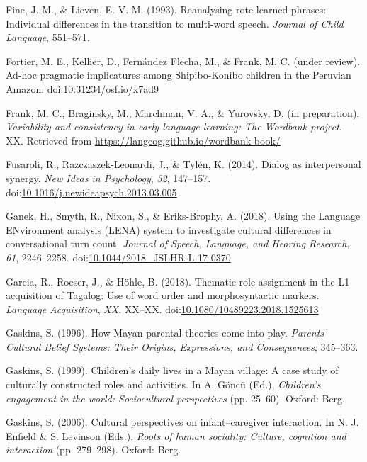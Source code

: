 \documentclass[floatsintext,man]{apa6}
\theoremstyle{definition}
\theoremstyle{definition}
\theoremstyle{definition}
\theoremstyle{remark}
\begin{document}
\hypertarget{ref-pine1993reanalysing}{}
Fine, J. M., \& Lieven, E. V. M. (1993). Reanalysing rote-learned
phrases: Individual differences in the transition to multi-word speech.
\emph{Journal of Child Language}, 551--571.

\hypertarget{ref-fortierURadhoc}{}
Fortier, M. E., Kellier, D., Fernández Flecha, M., \& Frank, M. C.
(under review). Ad-hoc pragmatic implicatures among Shipibo-Konibo
children in the Peruvian Amazon.
doi:\href{https://doi.org/10.31234/osf.io/x7ad9}{10.31234/osf.io/x7ad9}

\hypertarget{ref-frankIPvariability}{}
Frank, M. C., Braginsky, M., Marchman, V. A., \& Yurovsky, D. (in
preparation). \emph{Variability and consistency in early language
learning: The Wordbank project}. XX. Retrieved from
\url{https://langcog.github.io/wordbank-book/}

\hypertarget{ref-fusaroli2014synergy}{}
Fusaroli, R., Razczaszek-Leonardi, J., \& Tylén, K. (2014). Dialog as
interpersonal synergy. \emph{New Ideas in Psychology}, \emph{32},
147--157.
doi:\href{https://doi.org/10.1016/j.newideapsych.2013.03.005}{10.1016/j.newideapsych.2013.03.005}

\hypertarget{ref-ganek2018using}{}
Ganek, H., Smyth, R., Nixon, S., \& Eriks-Brophy, A. (2018). Using the
Language ENvironment analysis (LENA) system to investigate cultural
differences in conversational turn count. \emph{Journal of Speech,
Language, and Hearing Research}, \emph{61}, 2246--2258.
doi:\href{https://doi.org/10.1044/2018_JSLHR-L-17-0370}{10.1044/2018\_JSLHR-L-17-0370}

\hypertarget{ref-garcia2018thematic}{}
Garcia, R., Roeser, J., \& Höhle, B. (2018). Thematic role assignment in
the L1 acquisition of Tagalog: Use of word order and morphosyntactic
markers. \emph{Language Acquisition}, \emph{XX}, XX--XX.
doi:\href{https://doi.org/10.1080/10489223.2018.1525613}{10.1080/10489223.2018.1525613}

\hypertarget{ref-gaskins1996how}{}
Gaskins, S. (1996). How Mayan parental theories come into play.
\emph{Parents' Cultural Belief Systems: Their Origins, Expressions, and
Consequences}, 345--363.

\hypertarget{ref-gaskins1999childrens}{}
Gaskins, S. (1999). Children's daily lives in a Mayan village: A case
study of culturally constructed roles and activities. In A. Göncü (Ed.),
\emph{Children's engagement in the world: Sociocultural perspectives}
(pp. 25--60). Oxford: Berg.

\hypertarget{ref-gaskins2006cultural}{}
Gaskins, S. (2006). Cultural perspectives on infant--caregiver
interaction. In N. J. Enfield \& S. Levinson (Eds.), \emph{Roots of
human sociality: Culture, cognition and interaction} (pp. 279--298).
Oxford: Berg.
\end{document}
